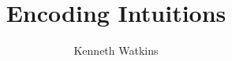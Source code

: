\documentclass{article}
\title{Encoding Intuitions}
\author{Kenneth Watkins}
\begin{document}
\maketitle
\tableofcontents

\pagebreak
%


\pagebreak

\end{document}
